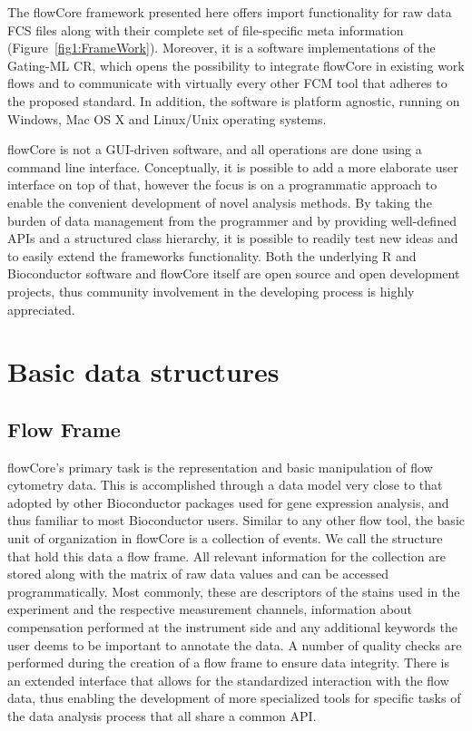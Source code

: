 \documentclass[12pt]{article}
\begin{document}
The flowCore framework presented here offers import functionality for
raw data FCS files along with their complete set of file-specific meta
information (Figure~\ref{fig1:FrameWork}). Moreover, it is a software
implementations of the Gating-ML CR, which opens the possibility to
integrate flowCore in existing work flows and to communicate with
virtually every other FCM tool that adheres to the proposed
standard. In addition, the software is platform agnostic, running on
Windows, Mac OS X and Linux/Unix operating systems.

flowCore is not a GUI-driven software, and all operations are done
using a command line interface. Conceptually, it is possible to add a
more elaborate user interface on top of that, however the focus is on
a programmatic approach to enable the convenient development of novel
analysis methods. By taking the burden of data management from the
programmer and by providing well-defined APIs and a structured class
hierarchy, it is possible to readily test new ideas and to easily
extend the frameworks functionality. Both the underlying R and
Bioconductor software and flowCore itself are open source and open
development projects, thus community involvement in the developing
process is highly appreciated.



\section*{Basic data structures}
\subsection*{Flow Frame}
flowCore's primary task is the representation and basic manipulation
of flow cytometry data. This is accomplished through a data model very
close to that adopted by other Bioconductor packages used for gene
expression analysis, and thus familiar to most Bioconductor
users. Similar to any other flow tool, the basic unit of organization
in flowCore is a collection of events. We call the structure that hold
this data a flow frame. All relevant information for the collection
are stored along with the matrix of raw data values and can be
accessed programmatically. Most commonly, these are descriptors of the
stains used in the experiment and the respective measurement channels,
information about compensation performed at the instrument side and
any additional keywords the user deems to be important to annotate the
data. A number of quality checks are performed during the creation of
a flow frame to ensure data integrity. There is an extended interface
that allows for the standardized interaction with the flow data, thus
enabling the development of more specialized tools for specific tasks
of the data analysis process that all share a common API.
\end{document}
